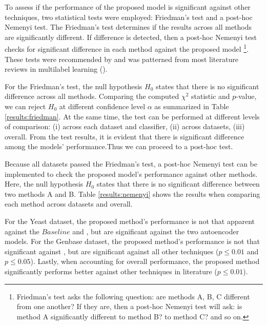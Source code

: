 To assess if the performance of the proposed model is significant against other
techniques, two statistical tests were employed: Friedman's test
and a post-hoc Nemenyi test. The Friedman's test determines if the results across all
methods are significantly different. If difference is detected, then a post-hoc
Nemenyi test checks for significant difference in each method against the proposed
model \footnote[2]{Friedman's test asks the following question: are methods A,
B, C different from one another? If they are, then a post-hoc Nemenyi test will
ask: is method A significantly different to method B? to method C? and so on.}.
These tests were recommended by \cite{demsar2006statistical}  and was patterned
from most literature reviews in multilabel learning
(\cite{madjarov2012extensive, zhang2014review}). 

\par For the Friedman's test, the null hypothesis $H_{0}$ states that there is no
significant difference across all methods. Comparing the computed
$\chi^{2}$ statistic and $p$-value, we can reject $H_{0}$ at different
confidence level $\alpha$ as summarized in Table
\ref{results:friedman}. At the same time, the test can be performed at
different levels of comparison: (i) across each dataset and classifier, (ii)
across datasets, (iii) overall. From the test results, it is evident that
there is significant difference among the models' performance.Thus we can
proceed to a post-hoc test.

\par Because all datasets passed the Friedman's test, a post-hoc Nemenyi test
can be implemented to check the proposed model's performance against other
methods. Here, the null hypothesis $H_{0}$ states that there is no
significant difference between two methods A and B. Table
\ref{results:nemenyi} shows the results when comparing each method across
datasets and overall. 







\par For the Yeast dataset, the proposed method's performance is not that
apparent against the $\textit{Baseline}$ and \cite{wang2013protein}, but are
significant against the two autoencoder models. For the Genbase dataset, the
proposed method's performance is not that significant against
\cite{miranda2017feature}, but are significant against all other techniques ($p
\leq 0.01$ and $p \leq 0.05$). Lastly, when accounting for overall performance,
the proposed method significantly performs better against other techniques in
literature ($p \leq 0.01$).

